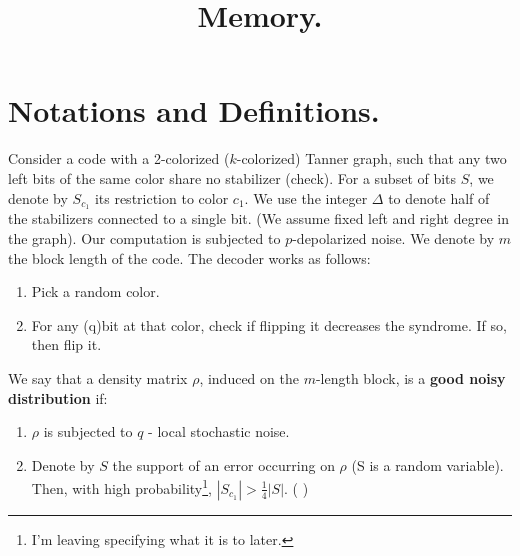 \documentclass[manuscript,screen,review]{acmart}
\begin{document}

\title{ Memory. }
\maketitle

\newcommand*{\Mbas}{\mathcal{X}^\prime}
\newcommand*{\bas}{\mathcal{X}}
\newcommand*{\sMbas}{\Mbas}
\newcommand*{\QQ}{C_{X}/C_{Z}^\perp }
\newcommand*{\trig}{ Triorthogonal }
\newcommand*{\Hyp}{ Hyperproduct }
\newcommand*{\Cin}{ C_{\text{initial}} }
\newcommand*{\Ctan}{ C_{\text{Tan}} }



\newcommand*{\QACze}{\mathbf{QAC}_{0}}
\newcommand*{\QNCzef}{\mathbf{QNC}_{0,f}}
\newcommand*{\QNCze}{\mathbf{QNC}_{0}}
\newcommand*{\QNCon}{\mathbf{QNC}_{1}}
\newcommand*{\NCon}{\mathbf{NC}_{1}}
\newcommand*{\noiseQNCon}{noisy-$\QNCon$}
\newcommand*{\QNC}{\mathbf{QNC}}
\newcommand*{\QNCG}{\mathbf{QNC_G}}
\newcommand*{\NC}{\mathbf{NC}}
\newcommand*{\QNCiG}{\mathbf{QNC_{G,i}}}


\newcommand*{\CDO} {CDFT} 


\section{Notations and Definitions.} Consider a code with a 2-colorized ($k$-colorized) Tanner graph, such that any two left bits of the same color share no stabilizer (check). For a subset of bits $S$, we denote by $S_{c_1}$ its restriction to color $c_1$. We use the integer $\Delta$ to denote half of the stabilizers connected to a single bit. (We assume fixed left and right degree in the graph). Our computation is subjected to $p$-depolarized noise. We denote by $m$ the block length of the code. The decoder works as follows:
\begin{enumerate}
  \item Pick a random color.
  \item For any (q)bit at that color, check if flipping it decreases the syndrome. If so, then flip it.
\end{enumerate}
We say that a density matrix $\rho$, induced on the $m$-length block, is a \textbf{good noisy distribution} if:
\begin{enumerate}
  \item $\rho$ is subjected to $q$ - local stochastic noise. 
  \item Denote by $S$ the support of an error occurring on $\rho$ (S is a random variable). Then, with high probability\footnote{I'm leaving specifying what it is to later.}, $|S_{c_{1}}| > \frac{1}{4} |S|$. (  )
\end{enumerate}
\end{document}

